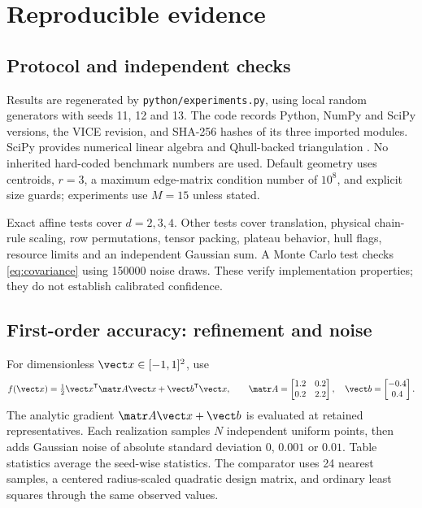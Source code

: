 \section{Reproducible evidence}
\subsection{Protocol and independent checks}
Results are regenerated by \texttt{python/experiments.py}, using local random
generators with seeds 11, 12 and 13. The code records Python, NumPy and SciPy
versions, the VICE revision, and SHA-256 hashes of its three imported modules.
SciPy provides numerical linear algebra and Qhull-backed triangulation
\cite{scipy2020,scipyDelaunay}. No inherited hard-coded benchmark numbers are
used. Default geometry uses centroids, $r=3$, a maximum edge-matrix condition
number of $10^8$, and explicit size guards; experiments use $M=15$ unless stated.

Exact affine tests cover $d=2,3,4$. Other tests cover translation, physical
chain-rule scaling, row permutations, tensor packing, plateau behavior, hull
flags, resource limits and an independent Gaussian sum. A Monte Carlo test
checks \cref{eq:covariance} using 150000 noise draws. These verify implementation
properties; they do not establish calibrated confidence.

\subsection{First-order accuracy: refinement and noise}
For dimensionless $\vect x\in[-1,1]^2$, use
\begin{equation}
 f(\vect x)=\tfrac12\vect x^{\mathsf T}\matr A\vect x+
             \vect b^{\mathsf T}\vect x,\qquad
 \matr A=\begin{bmatrix}1.2&0.2\\0.2&2.2\end{bmatrix},\quad
 \vect b=\begin{bmatrix}-0.4\\0.4\end{bmatrix}.
 \label{eq:quadratic}
\end{equation}
The analytic gradient $\matr A\vect x+\vect b$ is evaluated at retained
representatives. Each realization samples $N$ independent uniform points,
then adds Gaussian noise of absolute standard deviation $0$, $0.001$ or
$0.01$. Table statistics average the seed-wise statistics. The comparator
uses 24 nearest samples, a centered radius-scaled quadratic design matrix,
and ordinary least squares through the same observed values.

